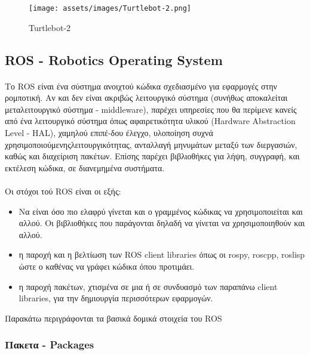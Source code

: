 \vspace{1.5 cm}
\begin{figure}[!ht]
	\centering
	\texttt{[image: assets/images/Turtlebot-2.png]}
	\caption{Turtlebot-2}
	\label{fig:figure of something}
\end{figure}
 
 \newpage
 
\subsection{ROS - Robotics Operating System}
 
\paragraph{} Το ROS είναι ένα σύστημα ανοιχτού κώδικα σχεδιασμένο για εφαρμογές στην ρομποτική. Αν και δεν είναι ακριβώς λειτουργικό σύστημα (συνήθως αποκαλείται μεταλειτουργικό σύστημα - middleware), παρέχει υπηρεσίες που θα περίμενε κανείς από ένα λειτουργικό σύστημα όπως αφαιρετικότητα υλικού (Hardware Abstraction Level - HAL), χαμηλού επιπέ-δου έλεγχο, υλοποίηση συχνά \hspace{0.1 cm}χρησιμοποιούμενης\hspace{0.1 cm}λειτουργικότητας, ανταλλαγή μηνυμάτων μεταξύ των διεργασιών, καθώς και διαχείριση πακέτων. Επίσης παρέχει βιβλιοθήκες για λήψη, συγγραφή, και εκτέλεση κώδικα, σε διανεμημένα συστήματα. \\
\\
Οι στόχοι τού ROS είναι οι εξής: 
\begin{itemize}
 	\item Να είναι όσο πιο ελαφρύ γίνεται και ο γραμμένος κώδικας να χρησιμοποιείται και αλλού. Οι βιβλιοθήκες που παράγονται δηλαδή να γίνεται να χρησιμοποιηθούν και αλλού. 
 	\item  η παροχή και η βελτίωση των ROS client libraries όπως οι rospy, roscpp, roslisp ώστε ο καθένας να γράφει κώδικα όπου προτιμάει.
 	\item η παροχή πακέτων, χτισμένα σε μια ή σε συνδυασμό των παραπάνω client libraries, για την δημιουργία περισσότερων εφαρμογών.    
\end{itemize}
 
 Παρακάτω περιγράφονται τα βασικά δομικά στοιχεία του ROS \\
 
\subsubsection{Πακετα - Packages}

